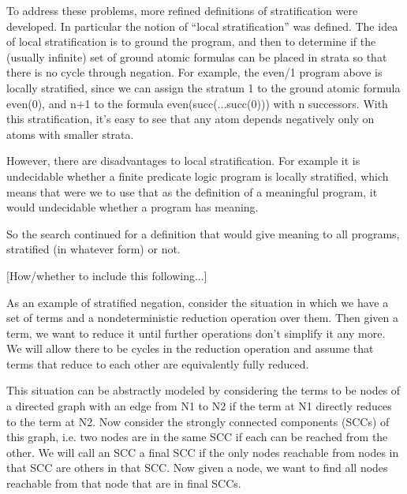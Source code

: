 To address these problems, more refined definitions of stratification
were developed.  In particular the notion of ``local stratification''
was defined.  The idea of local stratification is to ground the
program, and then to determine if the (usually infinite) set of ground
atomic formulas can be placed in strata so that there is no cycle
through negation.  For example, the even/1 program above is locally
stratified, since we can assign the stratum 1 to the ground atomic formula
even(0), and n+1 to the formula even(succ(...succ(0))) with n
successors.  With this stratification, it's easy to see that any atom
depends negatively only on atoms with smaller strata.

However, there are disadvantages to local stratification.  For example
it is undecidable whether a finite predicate logic program is locally
stratified, which means that were we to use that as the definition of
a meaningful program, it would undecidable whether a program has
meaning.

So the search continued for a definition that would give meaning to
all programs, stratified (in whatever form) or not.


[How/whether to include this following...]

As an example of stratified negation, consider the situation in which
we have a set of terms and a nondeterministic reduction operation over
them.  Then given a term, we want to reduce it until further
operations don't simplify it any more.  We will allow there to be
cycles in the reduction operation and assume that terms that reduce to
each other are equivalently fully reduced.

This situation can be abstractly modeled by considering the terms to
be nodes of a directed graph with an edge from N1 to N2 if the term at
N1 directly reduces to the term at N2.  Now consider the strongly
connected components (SCCs) of this graph, i.e. two nodes are in the
same SCC if each can be reached from the other.  We will call an SCC a
final SCC if the only nodes reachable from nodes in that SCC are
others in that SCC.  Now given a node, we want to find all nodes
reachable from that node that are in final SCCs.

